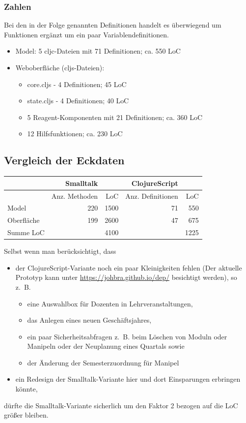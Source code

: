 \documentclass[11pt]{article}
\begin{document}
\subsubsection*{Zahlen}
\label{sec:org9946ac7}
Bei den in der Folge genannten Definitionen handelt es überwiegend um
Funktionen ergänzt um ein paar Variablendefinitionen.
\begin{itemize}
\item Model: 5 cljc-Dateien mit 71 Definitionen; ca. 550 LoC
\item Weboberfläche (cljs-Dateien):
\begin{itemize}
\item core.cljs - 4 Definitionen; 45 LoC
\item state.cljs - 4 Definitionen; 40 LoC
\item 5 Reagent-Komponenten mit 21 Definitionen; ca. 360 LoC
\item 12 Hilfsfunktionen; ca. 230 LoC
\end{itemize}
\end{itemize}
\subsection*{Vergleich der Eckdaten}
\label{sec:org29abe02}

\begin{center}
\begin{tabular}{lrrrr}
 & Smalltalk &  & ClojureScript & \\
\hline
 & Anz. Methoden & LoC & Anz. Definitionen & LoC\\
\hline
Model & 220 & 1500 & 71 & 550\\
Oberfläche & 199 & 2600 & 47 & 675\\
\hline
Summe LoC &  & 4100 &  & 1225\\
\hline
\end{tabular}
\end{center}

Selbst wenn man berücksichtigt, dass
\begin{itemize}
\item der ClojureScript-Variante noch ein paar Kleinigkeiten fehlen (Der
aktuelle Prototyp kann unter \url{https://johbra.github.io/dep/} besichtigt
werden), so z.~B. 
\begin{itemize}
\item eine Auswahlbox für Dozenten in Lehrveranstaltungen,
\item das Anlegen eines neuen Geschäftsjahres,
\item ein paar Sicherheitsabfragen z.~B. beim Löschen von Moduln
oder Manipeln oder der Neuplanung eines Quartals sowie
\item der Änderung der Semesterzuordnung für Manipel
\end{itemize}
\item ein Redesign der Smalltalk-Variante hier und dort Einsparungen
erbringen könnte,
\end{itemize}
dürfte die Smalltalk-Variante sicherlich um den Faktor 2 bezogen auf
die LoC größer bleiben.
\end{document}
